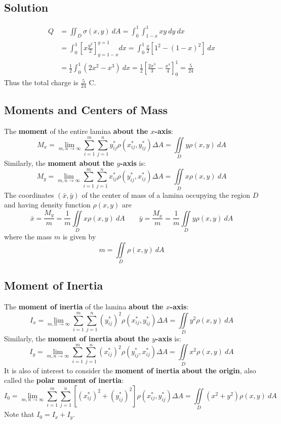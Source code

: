 \subsection*{Solution}
\begin{align*}
    Q & =\iint_D \sigma(x,y)\:dA=\int_0^1\int_{1-x}^1 xy\:dy\:dx                                                 \\
      & =\int_0^1\left[x\frac{y^2}{2}\right]_{y=1-x}^{y=1}dx=\int_0^1\frac{x}{2}[1^2-(1-x)^2]\:dx                \\
      & =\frac{1}{2}\int_0^1(2x^2-x^3)\:dx=\frac{1}{2}\left[\frac{2x^3}{3}-\frac{x^4}{4}\right]_0^1=\frac{5}{24}
\end{align*}
Thus the total charge is $\frac{5}{24}$ C.

\subsection*{Moments and Centers of Mass}
The \textbf{moment} of the entire lamina \textbf{about the $x$-axis}:
$$M_x=\lim_{m,n\to\infty}\sum_{i=1}^m\sum_{j=1}^n y_{ij}^*\rho(x_{ij}^*,y_{ij}^*)\Delta A=
    \iint\limits_D y\rho(x,y)\:dA$$
Similarly, the \textbf{moment about the $y$-axis} is:
$$M_y=\lim_{m,n\to\infty}\sum_{i=1}^m\sum_{j=1}^n x_{ij}^*\rho(y_{ij}^*,x_{ij}^*)\Delta A=
    \iint\limits_D x\rho(x,y)\:dA$$
The coordinates $(\bar{x},\bar{y})$ of the center of mass of a lamina occupying the region
$D$ and having density function $\rho(x,y)$ are
$$\bar{x}=\frac{M_y}{m}=\frac{1}{m}\iint\limits_D x\rho(x,y)\:dA \qquad
    \bar{y}=\frac{M_x}{m}=\frac{1}{m}\iint\limits_D y\rho(x,y)\:dA$$
where the mass $m$ is given by
$$m=\iint\limits_D \rho(x,y)\:dA$$

\subsection*{Moment of Inertia}
The \textbf{moment of inertia} of the lamina \textbf{about the $x$-axis}:
$$I_x=\lim_{m,n\to\infty}\sum_{i=1}^m\sum_{j=1}^n(y_{ij}^*)^2\rho(x_{ij}^*,y_{ij}^*)\Delta A=
    \iint\limits_D y^2\rho(x,y)\:dA$$
Similarly, the \textbf{moment of inertia about the $y$-axis} is:
$$I_y=\lim_{m,n\to\infty}\sum_{i=1}^m\sum_{j=1}^n(x_{ij}^*)^2\rho(y_{ij}^*,x_{ij}^*)\Delta A=
    \iint\limits_D x^2\rho(x,y)\:dA$$
It is also of interest to consider the \textbf{moment of inertia about the origin}, also
called the \textbf{polar moment of inertia}:
$$I_0=\lim_{m,n\to\infty}\sum_{i=1}^m\sum_{j=1}^n\left[(x_{ij}^*)^2+(y_{ij}^*)^2\right]
    \rho(x_{ij}^*,y_{ij}^*)\Delta A=\iint\limits_D(x^2+y^2)\rho(x,y)\:dA$$
Note that $I_0=I_x+I_y$.

